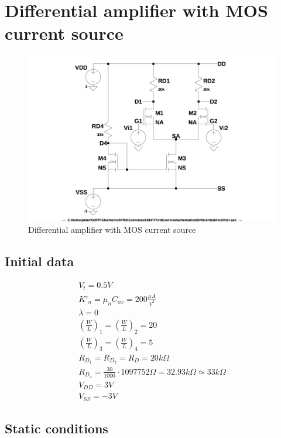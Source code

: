 \chapter{Differential amplifier with MOS current source}\label{diffampchapter}

\begin{figure}[h]
  \centering
  \includegraphics[width=12cm]{schematics/DifferentialAmplifier/Circuit.jpg}
  \caption{Differential amplifier with MOS current source}
  \label{DifferentialAmplifier}
\end{figure}

\section{Initial data}\label{DAInitialData}
\begin{align}
V_t = 0.5V\\
{K'}_n = {\mu}_n C_{ox} = 200 \frac{\mu A}{V^2}\\
\lambda = 0\\
\left(\frac{W}{L}\right)_1 = \left(\frac{W}{L}\right)_2 = 20\\
\left(\frac{W}{L}\right)_3 = \left(\frac{W}{L}\right)_4 = 5\\
R_{D_1} = R_{D_2} = R_D = 20k\Omega \label{RD}\\
R_{D_4} = \frac{30}{1000}\cdot 1097752 \Omega = 32.93k\Omega \simeq 33k\Omega\\
V_{DD} = 3V\\
V_{SS} = -3V
\end{align}

\section{Static conditions}

